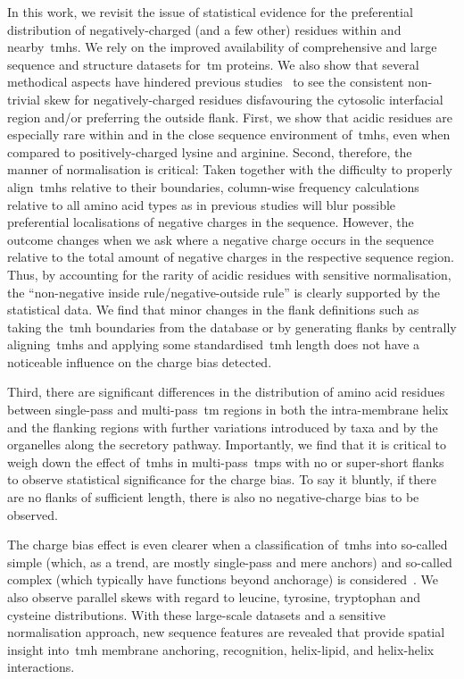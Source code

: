 In this work, we revisit the issue of statistical evidence for the preferential distribution of negatively\--charged (and a few other) residues within and nearby~\gls{tmh}s.
We rely on the improved availability of comprehensive and large sequence and structure datasets for~\gls{tm} proteins.
We also show that several methodical aspects have hindered previous studies~\cite{Sharpe2010, Baeza-Delgado2013, Pogozheva2013} to see the consistent non-trivial skew for negatively\--charged residues disfavouring the cytosolic interfacial region and/or preferring the outside flank.
First, we show that acidic residues are especially rare within and in the close sequence environment of~\gls{tmh}s, even when compared to positively\--charged lysine and arginine.
Second, therefore, the manner of normalisation is critical: Taken together with the difficulty to properly align~\gls{tmh}s relative to their boundaries, column-wise frequency calculations relative to all amino acid types as in previous studies will blur possible preferential localisations of negative charges in the sequence.
However, the outcome changes when we ask where a negative charge occurs in the sequence relative to the total amount of negative charges in the respective sequence region.
Thus, by accounting for the rarity of acidic residues with sensitive normalisation, the ``non-negative inside rule/negative-outside rule'' is clearly supported by the statistical data.
We find that minor changes in the flank definitions such as taking the~\gls{tmh} boundaries from the database or by generating flanks by centrally aligning~\gls{tmh}s and applying some standardised~\gls{tmh} length does not have a noticeable influence on the charge bias detected.

Third, there are significant differences in the distribution of amino acid residues between single\--pass and multi\--pass~\gls{tm} regions in both the intra-membrane helix and the flanking regions with further variations introduced by taxa and by the organelles along the secretory pathway.
Importantly, we find that it is critical to weigh down the effect of~\gls{tmh}s in multi\--pass~\gls{tmp}s with no or super-short flanks to observe statistical significance for the charge bias.
To say it bluntly, if there are no flanks of sufficient length, there is also no negative\--charge bias to be observed.

The charge bias effect is even clearer when a classification of~\gls{tmh}s into so-called simple (which, as a trend, are mostly single\--pass and mere anchors) and so-called complex (which typically have functions beyond anchorage) is considered~\cite{Wong2010, Wong2011, Wong2012}.
We also observe parallel skews with regard to leucine, tyrosine, tryptophan and cysteine distributions.
With these large-scale datasets and a sensitive normalisation approach, new sequence features are revealed that provide spatial insight into~\gls{tmh} membrane anchoring, recognition, helix-lipid, and helix-helix interactions.

